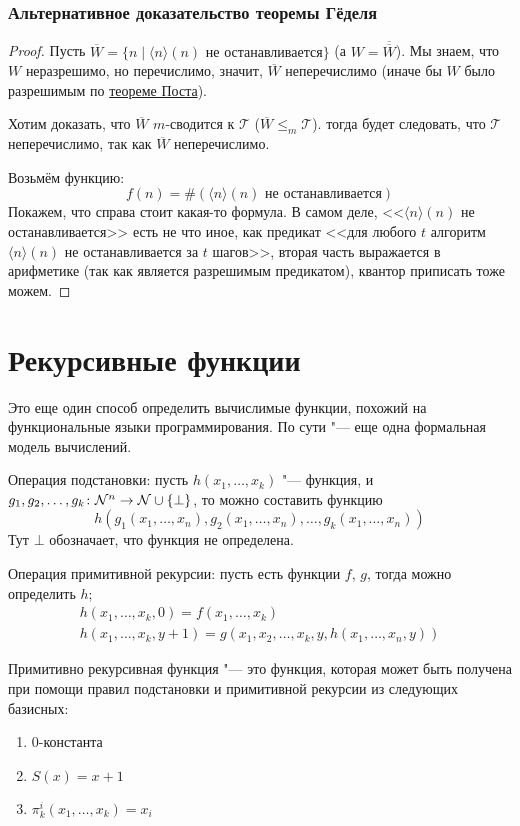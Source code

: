 \subsubsection{Альтернативное доказательство теоремы Гёделя}
\begin{proof}
	Пусть $\overline W = \{ n \mid \langle n \rangle (n) \text{~не останавливается} \}$ (а $W = \overline{\overline W}$).
	Мы знаем, что $W$ неразрешимо, но перечислимо, значит, $\overline W$ неперечислимо (иначе бы $W$ было разрешимым по \hyperref[postTh]{теореме Поста}).

	Хотим доказать, что $\overline W$ $m$-сводится к $\mathcal{T}$ ($\overline W \le_m \mathcal{T}$).
	тогда будет следовать, что $\mathcal{T}$ неперечислимо, так как $\overline W$ неперечислимо.

	Возьмём функцию:
	\[ f(n) = \# (\langle n \rangle (n) \text{~не останавливается}) \]
	Покажем, что справа стоит какая-то формула.
	В самом деле, <<$\langle n \rangle (n)$ не останавливается>> есть не что иное, как предикат
	<<для любого $t$ алгоритм $\langle n \rangle(n)$ не останавливается за $t$ шагов>>, вторая часть выражается в арифметике
	(так как является разрешимым предикатом), квантор приписать тоже можем.
\end{proof}

\section{Рекурсивные функции}
Это еще один способ определить вычислимые функции, похожий на функциональные языки программирования.
По сути "--- еще одна формальная модель вычислений.

\begin{Def}
	Операция подстановки:
	пусть $h(x_1, \dots, x_k)$ "--- функция, и $g_1, g_2, \dots, g_k \colon \mathcal{N}^n \to \mathcal{N} \cup \{\bot\}$, то можно составить
	функцию
	\[
	h(g_1(x_1, \dots, x_n), g_2(x_1, \dots, x_n), \dots, g_k(x_1, \dots, x_n))
	\]
	Тут $\bot$ обозначает, что функция не определена.
\end{Def}
\begin{Def}
	Операция примитивной рекурсии:
	пусть есть функции $f$, $g$, тогда можно определить $h$;
	\begin{gather*}
	h(x_1, \dots, x_k, 0) = f(x_1, \dots, x_k) \\
	h(x_1, \dots, x_k, y+1) = g(x_1, x_2, \dots, x_k, y, h(x_1, \dots, x_n, y))
	\end{gather*}
\end{Def}
\begin{Def}
	Примитивно рекурсивная функция "--- это функция, которая может быть получена при помощи
	правил подстановки и примитивной рекурсии из следующих базисных:
	\begin{enumerate}
	\item $0$-константа
	\item $S(x)=x+1$
	\item $\pi_k^i(x_1, \dots, x_k)=x_i$
	\end{enumerate}
\end{Def}

